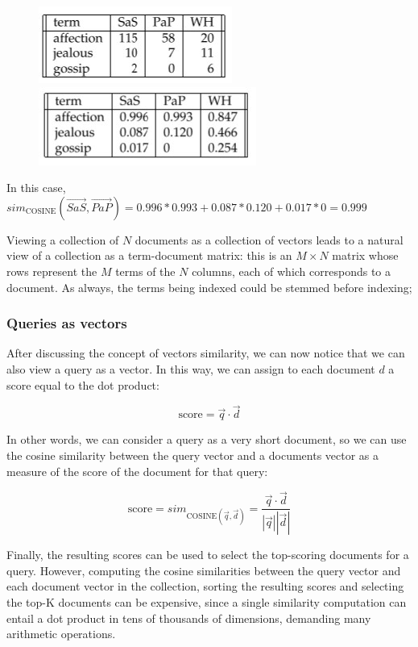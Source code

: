 \begin{figure}[h!]
		\centering
		\includegraphics[scale = 2.0]{img/example cosine 1.jpg}
        \includegraphics[scale = 2.0]{img/example cosine 2.jpg}
		\label{example cosine}
\end{figure}

In this case, $sim_{\text{COSINE}}(\Vec{SaS}, \Vec{PaP}) = 0.996 * 0.993 + 0.087 * 0.120 + 0.017 * 0 = 0.999 $ 

Viewing a collection of $N$ documents as a collection of vectors leads to a natural view of a collection as a term-document matrix: this is an $M \times N$ matrix whose rows represent the $M$ terms of the $N$ columns, each of which corresponds to a document. As always, the terms being indexed could be stemmed before indexing;

\subsubsection{Queries as vectors}
After discussing the concept of vectors similarity, we can now notice that we can also view a query as a vector. In this way, we can assign to each document $d$ a score equal to the dot product:

$$
\text{score} = \Vec{q} \cdot \Vec{d}
$$

In other words, we can consider a query as a very short document, so we can use the cosine similarity between the query vector and a documents vector as a measure of the score of the document for that query:

$$
\text{score} = sim_{\text{COSINE}(\Vec{q}, \Vec{d})} = \frac{\Vec{q} \cdot \Vec{d}}{|\Vec{q}||\Vec{d}|}
$$

Finally, the resulting scores can be used to select the top-scoring documents for a query. However, computing the cosine similarities between the query vector and each document vector in the collection, sorting the resulting scores and selecting the top-K documents can be expensive, since a single similarity computation can entail a dot product in tens of thousands of dimensions, demanding many arithmetic operations.

